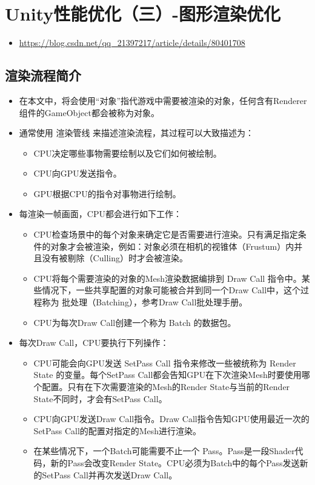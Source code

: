 \documentclass[9pt, b5paper]{article}
\begin{document}
\section{Unity性能优化（三）-图形渲染优化}
\label{sec-6}
\begin{itemize}
\item \url{https://blog.csdn.net/qq_21397217/article/details/80401708}
\end{itemize}
\subsection{渲染流程简介}
\label{sec-6-1}
\begin{itemize}
\item 在本文中，将会使用“对象”指代游戏中需要被渲染的对象，任何含有Renderer组件的GameObject都会被称为对象。
\item 通常使用 渲染管线 来描述渲染流程，其过程可以大致描述为：
\begin{itemize}
\item CPU决定哪些事物需要绘制以及它们如何被绘制。
\item CPU向GPU发送指令。
\item GPU根据CPU的指令对事物进行绘制。
\end{itemize}
\item 每渲染一帧画面，CPU都会进行如下工作：
\begin{itemize}
\item CPU检查场景中的每个对象来确定它是否需要进行渲染。只有满足指定条件的对象才会被渲染，例如：对象必须在相机的视锥体（Frustum）内并且没有被剔除（Culling）时才会被渲染。
\item CPU将每个需要渲染的对象的Mesh渲染数据编排到 Draw Call 指令中。某些情况下，一些共享配置的对象可能被合并到同一个Draw Call中，这个过程称为 批处理（Batching），参考Draw Call批处理手册。
\item CPU为每次Draw Call创建一个称为 Batch 的数据包。
\end{itemize}
\item 每次Draw Call，CPU要执行下列操作：
\begin{itemize}
\item CPU可能会向GPU发送 SetPass Call 指令来修改一些被统称为 Render State 的变量。每个SetPass Call都会告知GPU在下次渲染Mesh时要使用哪个配置。只有在下次需要渲染的Mesh的Render State与当前的Render State不同时，才会有SetPass Call。
\item CPU向GPU发送Draw Call指令。Draw Call指令告知GPU使用最近一次的SetPass Call的配置对指定的Mesh进行渲染。
\item 在某些情况下，一个Batch可能需要不止一个 Pass。Pass是一段Shader代码，新的Pass会改变Render State。CPU必须为Batch中的每个Pass发送新的SetPass Call并再次发送Draw Call。

\end{itemize}
\end{itemize}
\end{document}

